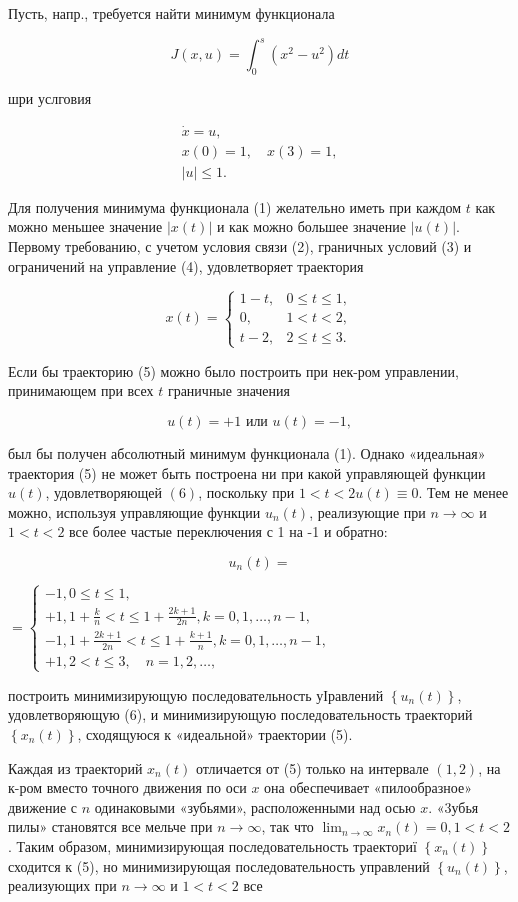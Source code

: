 \documentclass[10pt]{article}
\begin{document}
Пусть, напр., требуется найти минимум функционала

\[
J(x, u)=\int_{0}^{s}\left(x^{2}-u^{2}\right) d t
\]

шри услговия

\[
\begin{gathered}
\dot{x}=u, \\
x(0)=1, \quad x(3)=1, \\
|u| \leqslant 1 .
\end{gathered}
\]

Для получения минимума функционала (1) желательно иметь при каждом $t$ как можно меньшее значение $|x(t)|$ и как можно большее значение $|u(t)|$. Первому требованию, с учетом условия связи (2), граничных условий (3) и ограничений на управление (4), удовлетворяет траектория

\[
x(t)=\left\{\begin{array}{cl}
1-t, & 0 \leqslant t \leqslant 1, \\
0, & 1<t<2, \\
t-2, & 2 \leqslant t \leqslant 3 .
\end{array}\right.
\]

Если бы траекторию (5) можно было построить при нек-ром управлении, принимающем при всех $t$ граничные значения

\[
u(t)=+1 \text { или } u(t)=-1,
\]

был бы получен абсолютный минимум функционала (1). Однако «идеальная» траектория (5) не может быть построена ни при какой управляющей функции $u(t)$, удовлетворяющей $(6)$, поскольку при $1<t<2 u(t) \equiv 0$. Тем не менее можно, используя управляющие функции $u_{n}(t)$, реализующие при $n \rightarrow \infty$ и $1<t<2$ все более частые переключения с 1 на -1 и обратно:

\[
u_{n}(t)=
\]

$=\left\{\begin{array}{l}-1,0 \leqslant t \leqslant 1, \\ +1,1+\frac{k}{n}<t \leqslant 1+\frac{2 k+1}{2 n}, k=0,1, \ldots, n-1, \\ -1,1+\frac{2 k+1}{2 n}<t \leqslant 1+\frac{k+1}{n}, k=0,1, \ldots, n-1, \\ +1,2<t \leqslant 3, \quad n=1,2, \ldots,\end{array}\right.$

построить минимизирующую последовательность уІравлений $\left\{u_{n}(t)\right\}$, удовлетворяющую (6), и минимизирующую последовательность траекторий $\left\{x_{n}(t)\right\}$, сходящуюся к «идеальной» траектории (5).

Каждая из траекторий $x_{n}(t)$ отличается от (5) только на интервале $(1,2)$, на к-ром вместо точного движения по оси $x$ она обеспечивает «пилообразное» движение с $n$ одинаковыми «зубьями», расположенными над осью $x$. «3убья пилы» становятся все мельче при $n \rightarrow \infty$, так что $\lim _{n \rightarrow \infty} x_{n}(t)=0,1<t<2$. Таким образом, минимизирующая последовательность траекториї $\left\{x_{n}(t)\right\}$ сходится к (5), но минимизирующая последовательность управлений $\left\{u_{n}(t)\right\}$, реализующих при $n \rightarrow \infty$ и $1<t<2$ все
\end{document}
